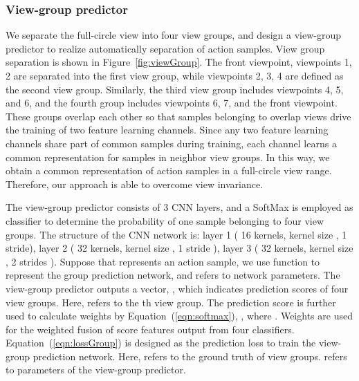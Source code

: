 \documentclass[journal]{IEEEtran}
\begin{document}
\subsubsection{View-group predictor}
We separate the full-circle view into four view groups, and design a view-group predictor to realize automatically separation of action samples.
View group separation is shown in Figure~\ref{fig:viewGroup}. The front viewpoint, viewpoints 1, 2 are separated into the first view group, while viewpoints 2, 3, 4 are defined as the second view group. Similarly, the third view group includes viewpoints 4, 5, and 6, and the fourth group includes viewpoints 6, 7, and the front viewpoint. These groups overlap each other so that samples belonging to overlap views drive the training of two feature learning channels. Since any two feature learning channels share part of common samples during training, each channel learns a common representation for samples in neighbor view groups. In this way, we obtain a common representation of action samples in a full-circle view range. Therefore, our approach is able to overcome view invariance.

The view-group predictor consists of 3 CNN layers, and a SoftMax is employed as classifier to determine the probability of one sample belonging to four view groups. The structure of the CNN network is: layer 1 ( 16 kernels, kernel size , 1 stride), layer 2 ( 32 kernels, kernel size , 1 stride ), layer 3 ( 32 kernels, kernel size , 2 strides ). Suppose that  represents an action sample, we use function  to represent the group prediction network, and  refers to network parameters. The view-group predictor outputs a vector, , which indicates prediction scores of four view groups. Here,  refers to the th view group. The prediction score is further used to calculate weights by Equation~(\ref{eqn:softmax}), , where . Weights  are used for the weighted fusion of score features output from four classifiers. Equation~(\ref{eqn:lossGroup}) is designed as the prediction loss to train the view-group prediction network. Here,  refers to the ground truth of view groups.  refers to parameters of the view-group predictor.
\end{document}
